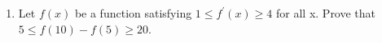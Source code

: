 \documentclass{article}
\begin{document}
\begin{enumerate}[label=\textbf{(10.\arabic*)}]


    \item Let $f(x)$ be a function satisfying $1\le f^\prime(x) \ge4$ for all x. Prove that $5\le f(10)-f(5)\ge 20$.
    \par
    
    
    
\end{enumerate}
\end{document}
